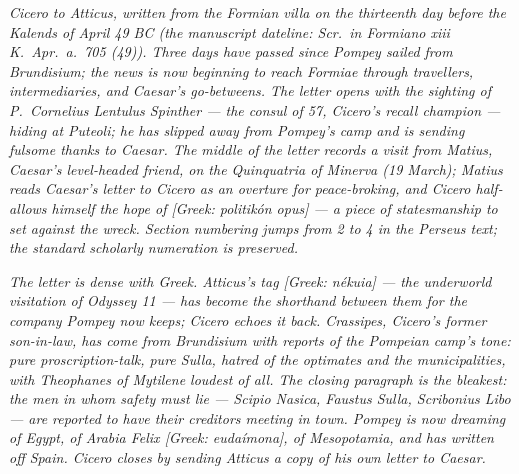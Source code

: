 
\textit{Cicero to Atticus, written from the Formian villa
on the thirteenth day before the Kalends of April 49 BC
(the manuscript dateline: \textit{Scr.\ in Formiano xiii
K.\ Apr.\ a.\ 705 (49)}). Three days have passed since
Pompey sailed from Brundisium; the news is now beginning
to reach Formiae through travellers, intermediaries, and
Caesar's go-betweens. The letter opens with the
sighting of P.\ Cornelius Lentulus Spinther --- the
consul of 57, Cicero's recall champion --- hiding at
Puteoli; he has slipped away from Pompey's camp and is
sending fulsome thanks to Caesar. The middle of the
letter records a visit from Matius, Caesar's
level-headed friend, on the Quinquatria of Minerva
(19 March); Matius reads Caesar's letter to Cicero as
an overture for peace-broking, and Cicero half-allows
himself the hope of \textit{[Greek: politik\'on opus]}
--- a piece of statesmanship to set against the wreck.
Section numbering jumps from 2 to 4 in the Perseus
text; the standard scholarly numeration is preserved.}

\textit{The letter is dense with Greek. Atticus's tag
\textit{[Greek: n\'ekuia]} --- the underworld
visitation of Odyssey 11 --- has become the shorthand
between them for the company Pompey now keeps;
Cicero echoes it back. Crassipes, Cicero's
former son-in-law, has come from Brundisium with
reports of the Pompeian camp's tone: pure
proscription-talk, pure Sulla, hatred of the optimates
and the municipalities, with Theophanes of Mytilene
loudest of all. The closing paragraph is the bleakest:
the men in whom safety must lie --- Scipio Nasica,
Faustus Sulla, Scribonius Libo --- are reported to
have their creditors meeting in town. Pompey is now
dreaming of Egypt, of Arabia Felix \textit{[Greek:
euda\'imona]}, of Mesopotamia, and has written off
Spain. Cicero closes by sending Atticus a copy of his
own letter to Caesar.}
